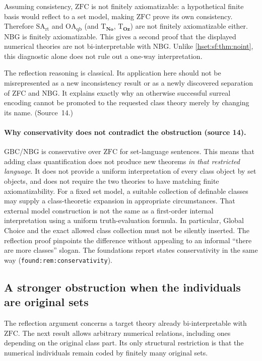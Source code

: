 \documentclass[11pt,letterpaper]{article}
\theoremstyle{definition}
\theoremstyle{remark}
\newcommand{\No}{\mathbf{No}}
\newcommand{\ZFC}{\mathrm{ZFC}}
\newcommand{\lbl}[1]{\nolinkurl{#1}}
\newcommand{\Oz}{\mathbf{Oz}}
\newcommand{\Tth}{\mathrm{T}}
\newcommand{\SArt}{\mathrm{SA}_{\mathrm{rt}}}
\newcommand{\OAqb}{\mathrm{OA}_{\mathrm{qb}}}
\begin{document}
Assuming consistency, $\ZFC$ is not finitely axiomatizable: a hypothetical finite
basis would reflect to a set model, making $\ZFC$ prove its own consistency.
Therefore $\SArt$ and $\OAqb$ (and $\Tth_{\No}$, $\Tth_{\Oz}$) are not finitely
axiomatizable either. NBG is finitely axiomatizable. This gives a second proof that
the displayed numerical theories are not bi-interpretable with NBG. Unlike
\cref{hset:sf:thm:noint}, this diagnostic alone does not rule out a one-way
interpretation.

The reflection reasoning is classical. Its application here should not be
misrepresented as a new inconsistency result or as a newly discovered separation of
ZFC and NBG. It explains exactly why an otherwise successful surreal encoding
cannot be promoted to the requested class theory merely by changing its name.
(Source~14.)

\paragraph{Why conservativity does not contradict the obstruction (source 14).}
\label{hset:sf:sub:conservativity}
GBC/NBG is conservative over $\ZFC$ for set-language sentences. This means that
adding class quantification does not produce new theorems \emph{in that restricted
language}. It does not provide a uniform interpretation of every class object by
set objects, and does not require the two theories to have matching finite
axiomatizability. For a fixed set model, a suitable collection of definable classes
may supply a class-theoretic expansion in appropriate circumstances. That external
model construction is not the same as a first-order internal interpretation using a
uniform truth-evaluation formula. In particular, Global Choice and the exact
allowed class collection must not be silently inserted. The reflection proof
pinpoints the difference without appealing to an informal ``there are more
classes'' slogan. The foundations report states conservativity in the same way
(\lbl{found:rem:conservativity}).

\subsection{A stronger obstruction when the individuals are original sets}

The reflection argument concerns a target theory already bi-interpretable with
$\ZFC$. The next result allows arbitrary numerical relations, including ones
depending on the original class part. Its only structural restriction is that the
numerical individuals remain coded by finitely many original sets.
\end{document}
